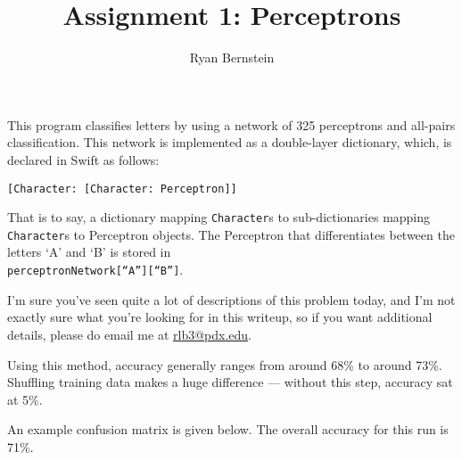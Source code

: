 \documentclass[11pt, oneside]{article}    %
\title{Assignment 1: Perceptrons}
\author{Ryan Bernstein}
\date{}
\begin{document}
\maketitle

This program classifies letters by using a network of 325 perceptrons and all-pairs classification. This network is implemented as a double-layer dictionary, which, is declared in Swift as follows:
\begin{center}
	\texttt{[Character: [Character: Perceptron]]}
\end{center}
That is to say, a dictionary mapping \texttt{Character}s to sub-dictionaries mapping \texttt{Character}s to Perceptron objects. The Perceptron that differentiates between the letters `A' and `B' is stored in \\\texttt{perceptronNetwork[``A''][``B'']}.

I'm sure you've seen quite a lot of descriptions of this problem today, and I'm not exactly sure what you're looking for in this writeup, so if you want additional details, please do email me at \href{mailto:rlb3@pdx.edu}{rlb3@pdx.edu}.

Using this method, accuracy generally ranges from around 68\% to around 73\%. Shuffling training data makes a huge difference --- without this step, accuracy sat at 5\%.

An example confusion matrix is given below. The overall accuracy for this run is 71\%.
\end{document}
